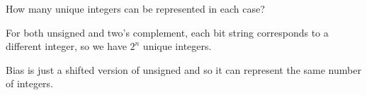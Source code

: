 \begin{blocksection}
\question
How many unique integers can be represented in each case?


\begin{solution}
For both unsigned and two’s complement, each bit string corresponds to a different integer, so we have $2^n$ unique integers.
 
 
Bias is just a shifted version of unsigned and so it can represent the same number of integers.
\end{solution}

\end{blocksection}